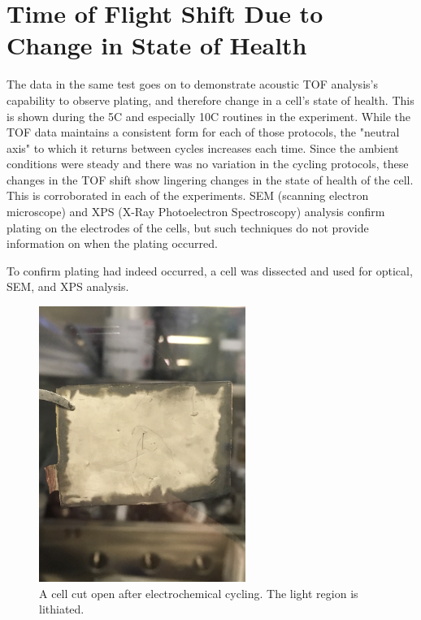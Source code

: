 
\section{Time of Flight Shift Due to Change in State of Health}
The data in the same test goes on to demonstrate acoustic TOF analysis's capability to observe plating, and therefore change in a cell's state of health. This is shown during the 5C and especially 10C routines in the experiment. 
While the TOF data maintains a consistent form for each of those protocols, the "neutral axis" to which it returns between cycles increases each time. 
Since the ambient conditions were steady and there was no variation in the cycling protocols, these changes in the TOF shift show lingering changes in the state of health of the cell. 
This is corroborated in each of the experiments. 
SEM (scanning electron microscope) and XPS (X-Ray Photoelectron Spectroscopy) analysis confirm plating on the electrodes of the cells, but such techniques do not provide information on when the plating occurred. 

To confirm plating had indeed occurred, a cell was dissected and used for optical, SEM, and XPS analysis.

\begin{figure}[t]\label{fig:optical}
\includegraphics[width=0.6\textwidth]{Thesis/optical.JPG}
\centering
\caption{A cell cut open after electrochemical cycling. The light region is lithiated.}
\end{figure}

